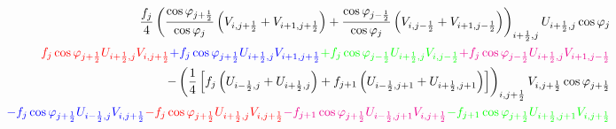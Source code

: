 \documentclass{ctexart}
\begin{document}
\begin{align*}
  \frac{f_{j}}{4} \left( \frac{\cos{\varphi_{j+\frac{1}{2}}}}{\cos{\varphi_{j}}} \left( V_{i,j+\frac{1}{2}} + V_{i+1,j+\frac{1}{2}} \right) + \frac{\cos{\varphi_{j-\frac{1}{2}}}}{\cos{\varphi_{j}}} \left( V_{i,j-\frac{1}{2}} + V_{i+1,j-\frac{1}{2}} \right) \right)_{i+\frac{1}{2},j} U_{i+\frac{1}{2},j} \cos{\varphi_j} \\
{\color{red}f_j \cos{\varphi_{j+\frac{1}{2}}} U_{i+\frac{1}{2},j} V_{i,j+\frac{1}{2}}} {\color{blue}+ f_j \cos{\varphi_{j+\frac{1}{2}}} U_{i+\frac{1}{2},j} V_{i+1,j+\frac{1}{2}}} {\color{green}+ f_j \cos{\varphi_{j-\frac{1}{2}}} U_{i+\frac{1}{2},j} V_{i,j-\frac{1}{2}}} {\color{magenta}+ f_j \cos{\varphi_{j-\frac{1}{2}}} U_{i+\frac{1}{2},j} V_{i+1,j-\frac{1}{2}}} \\
- \left( \frac{1}{4} \left[ f_{j} \left( U_{i-\frac{1}{2},j} + U_{i+\frac{1}{2},j} \right) + f_{j+1} \left( U_{i-\frac{1}{2},j+1} + U_{i+\frac{1}{2},j+1} \right) \right] \right)_{i,j+\frac{1}{2}} V_{i,j+\frac{1}{2}} \cos{\varphi_{j+\frac{1}{2}}} \\
{\color{blue}- f_j \cos{\varphi_{j+\frac{1}{2}}} U_{i-\frac{1}{2},j} V_{i,j+\frac{1}{2}}} {\color{red}- f_j \cos{\varphi_{j+\frac{1}{2}}} U_{i+\frac{1}{2},j} V_{i,j+\frac{1}{2}}} {\color{magenta}- f_{j+1} \cos{\varphi_{j+\frac{1}{2}}} U_{i-\frac{1}{2},j+1} V_{i,j+\frac{1}{2}}} {\color{green}- f_{j+1} \cos{\varphi_{j+\frac{1}{2}}} U_{i+\frac{1}{2},j+1} V_{i,j+\frac{1}{2}}}
\end{align*}
\end{document}
